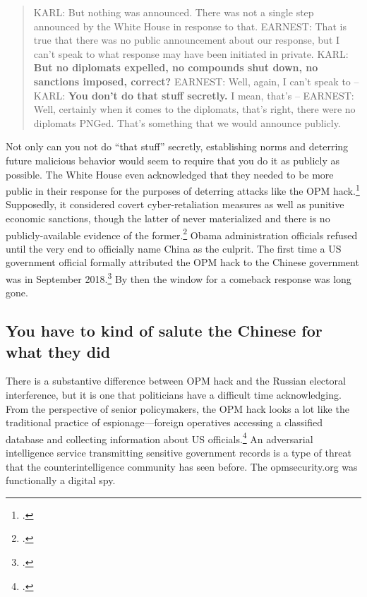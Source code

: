 \documentclass{memoir}
\begin{document}
\begin{refsegment}
\begin{quote}
KARL: But nothing was announced. There was not a single step announced by the White House in response to that.
\newline \newline
EARNEST: That is true that there was no public announcement about our response, but I can't speak to what response may have been initiated in private.
\newline \newline
KARL: \textbf{But no diplomats expelled, no compounds shut down, no sanctions imposed, correct?}
\newline \newline
EARNEST: Well, again, I can't speak to --
\newline \newline
KARL: \textbf{You don't do that stuff secretly.}  I mean, that's --
\newline \newline
EARNEST: Well, certainly when it comes to the diplomats, that's right, there were no diplomats PNGed. That's something that we would announce publicly.
\end{quote}
Not only can you not do ``that stuff'' secretly, establishing norms and deterring future malicious behavior would seem to require that you do it as publicly as possible. The White House even acknowledged that they needed to be more public in their response for the purposes of deterring attacks like the OPM hack.\footcite{sanger_u.s._2016} Supposedly, it considered covert cyber-retaliation measures as well as punitive economic sanctions, though the latter of never materialized and there is no publicly-available evidence of the former.\footcite{nakashima_hacks_2015} Obama administration officials refused until the very end to officially name China as the culprit. The first time a US government official formally attributed the OPM hack to the Chinese government was in September 2018.\footcite{sanger_trump_2018} By then the window for a comeback response was long gone.

\subsection{You have to kind of salute the Chinese for what they did}
There is a substantive difference between OPM hack and the Russian electoral interference, but it is one that politicians have a difficult time acknowledging. From the perspective of senior policymakers, the OPM hack looks a lot like the traditional practice of espionage---foreign operatives accessing a classified database and collecting information about US officials.\footcite{nakashima_chinese_2015} An adversarial intelligence service transmitting sensitive government records is a type of threat that the counterintelligence community has seen before. The opmsecurity.org was functionally a digital spy.


\end{refsegment}
\end{document}
